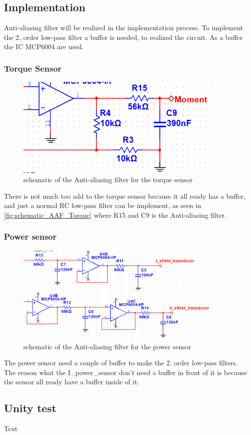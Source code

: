 \subsection{Implementation}

Anti-aliasing filter will be realized in the implementation process. To implement the 2. order low-pass filter a buffer is needed, to realized the circuit. As a buffer the IC MCP6004 are used.
	
\subsubsection*{Torque Sensor}
	
\begin{figure}[H]
	\centering
	\includegraphics [width=4in]{Hardware/Pictures/AAF_moment.PNG}
	\caption{schematic of the Anti-aliasing filter for the torque sensor}
	\label{fig:schematic_AAF_Torque}
\end{figure}
	
There is not much too add to the torque sensor because it all ready has a buffer, and just a normal RC low-pass filter can be implement, as seen in \vref{fig:schematic_AAF_Torque} where R15 and C9 is the Anti-aliasing filter.
	
\subsubsection*{Power sensor}

\begin{figure}[H]
	\centering
	\includegraphics [width=4in]{Hardware/Pictures/AAF_effekt.PNG}
	\caption{schematic of the Anti-aliasing filter for the power sensor}
	\label{fig:schematic_AAF_power}
\end{figure}
	
The power sensor need a couple of buffer to make the 2. order low-pass filters. The reason what the I\_power\_sensor don't need a buffer in front of it is because the sensor all ready have a buffer inside of it.   

\subsection{Unity test}
Text 